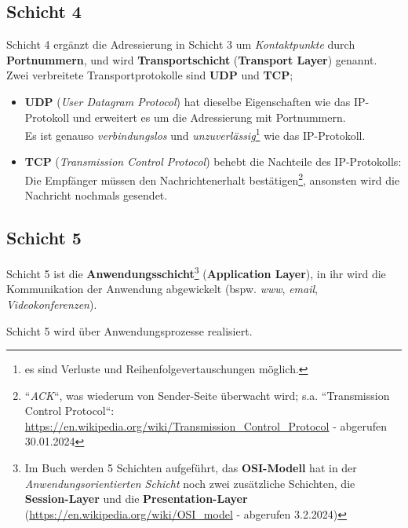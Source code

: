 \subsection*{Schicht 4}
Schicht 4 ergänzt die Adressierung in Schicht 3 um \textit{Kontaktpunkte} durch \textbf{Portnummern}, und wird \textbf{Transportschicht} (\textbf{Transport Layer}) genannt.\\

\noindent
Zwei verbreitete Transportprotokolle sind \textbf{UDP} und \textbf{TCP};

\begin{itemize}
    \item \textbf{UDP} (\textit{User Datagram Protocol}) hat dieselbe Eigenschaften wie das IP-Protokoll und erweitert es um die Adressierung mit Portnummern.\\
    Es ist genauso   \textit{verbindungslos} und \textit{unzuverlässig}\footnote{
    es sind Verluste und Reihenfolgevertauschungen möglich.
    } wie das IP-Protokoll.
    \item \textbf{TCP} (\textit{Transmission Control Protocol}) behebt die Nachteile des IP-Protokolls: Die Empfänger müssen den Nachrichtenerhalt bestätigen\footnote{ ``\textit{ACK}``,
    was wiederum von Sender-Seite überwacht wird; s.a. ``Transmission Control Protocol``: \url{https://en.wikipedia.org/wiki/Transmission_Control_Protocol} - abgerufen 30.01.2024
    }, ansonsten wird die Nachricht nochmals gesendet.
\end{itemize}


\subsection*{Schicht 5}
Schicht 5 ist die \textbf{Anwendungsschicht}\footnote{
    Im Buch werden 5 Schichten aufgeführt, das \textbf{OSI-Modell} hat in der \textit{Anwendungsorientierten Schicht} noch zwei zusätzliche Schichten, die \textbf{Session-Layer} und die \textbf{Presentation-Layer} (\url{https://en.wikipedia.org/wiki/OSI_model} - abgerufen 3.2.2024)
} (\textbf{Application Layer}), in ihr wird die Kommunikation der Anwendung abgewickelt (bspw. \textit{www}, \textit{email}, \textit{Videokonferenzen}).

\begin{tcolorbox}[enlarge top by=0.5cm,enlarge bottom by=0.5cm]
    Schicht 5 wird über Anwendungsprozesse realisiert.
\end{tcolorbox}


